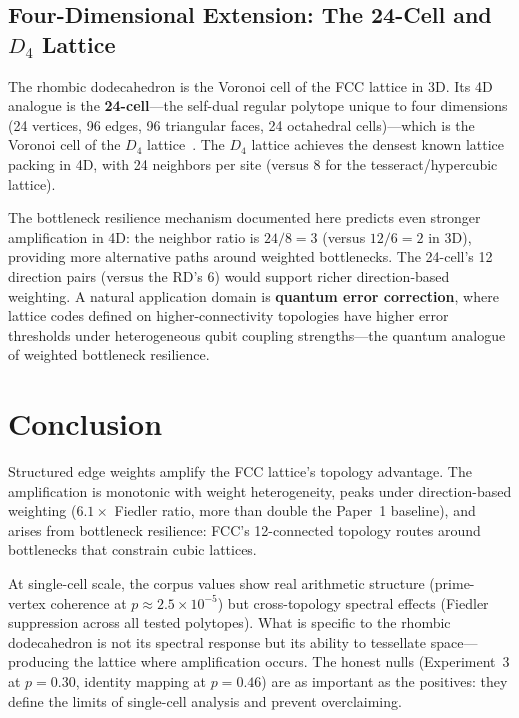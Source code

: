\documentclass[11pt]{article}
\begin{document}
\subsection{Four-Dimensional Extension: The 24-Cell and $D_4$ Lattice}

The rhombic dodecahedron is the Voronoi cell of the FCC lattice in
3D. Its 4D analogue is the \textbf{24-cell}---the self-dual regular
polytope unique to four dimensions (24 vertices, 96 edges, 96
triangular faces, 24 octahedral cells)---which is the Voronoi cell
of the $D_4$ lattice~\cite{conway1999, coxeter1973}. The $D_4$
lattice achieves the densest known lattice packing in 4D, with 24
neighbors per site (versus 8 for the tesseract/hypercubic lattice).

The bottleneck resilience mechanism documented here predicts even
stronger amplification in 4D: the neighbor ratio is $24/8 = 3$
(versus $12/6 = 2$ in 3D), providing more alternative paths around
weighted bottlenecks. The 24-cell's 12 direction pairs (versus the
RD's 6) would support richer direction-based weighting. A natural
application domain is \textbf{quantum error correction}, where
lattice codes defined on higher-connectivity topologies have higher
error thresholds under heterogeneous qubit coupling strengths---the
quantum analogue of weighted bottleneck resilience.

\section{Conclusion}
\label{sec:conclusion}

Structured edge weights amplify the FCC lattice's topology
advantage. The amplification is monotonic with weight heterogeneity,
peaks under direction-based weighting ($6.1\times$ Fiedler ratio,
more than double the Paper~1 baseline), and arises from bottleneck
resilience: FCC's 12-connected topology routes around bottlenecks
that constrain cubic lattices.

At single-cell scale, the corpus values show real arithmetic
structure (prime-vertex coherence at $p \approx 2.5 \times 10^{-5}$) but
cross-topology spectral effects (Fiedler suppression across all
tested polytopes).
What is specific to the rhombic dodecahedron is not its spectral
response but its ability to tessellate space---producing the
lattice where amplification occurs. The honest nulls (Experiment~3
at $p = 0.30$, identity mapping at $p = 0.46$) are as important as
the positives: they define the limits of single-cell analysis and
prevent overclaiming.
\end{document}
